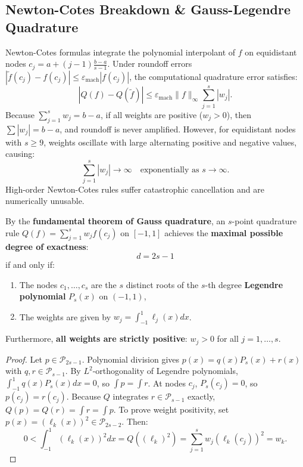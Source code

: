 \subsection{Newton-Cotes Breakdown \& Gauss-Legendre Quadrature}

Newton-Cotes formulas integrate the polynomial interpolant of $f$ on equidistant nodes $c_j = a + (j-1)\frac{b-a}{s-1}$. Under roundoff errors $|\tilde{f}(c_j) - f(c_j)| \le \varepsilon_{\text{mach}}|f(c_j)|$, the computational quadrature error satisfies:
\begin{equation}
    |Q(f) - Q(\tilde{f})| \le \varepsilon_{\text{mach}} \|f\|_\infty \sum_{j=1}^{s} |w_j|.
\end{equation}
Because $\sum_{j=1}^s w_j = b - a$, if all weights are positive ($w_j > 0$), then $\sum |w_j| = b - a$, and roundoff is never amplified. However, for equidistant nodes with $s \ge 9$, weights oscillate with large alternating positive and negative values, causing:
\begin{equation}
    \sum_{j=1}^{s} |w_j| \to \infty \quad \text{exponentially as } s \to \infty.
\end{equation}
High-order Newton-Cotes rules suffer catastrophic cancellation and are numerically unusable.

\begin{theorem}
    By the \textbf{fundamental theorem of Gauss quadrature}, an $s$-point quadrature rule $Q(f) = \sum_{j=1}^{s} w_j f(c_j)$ on $[-1, 1]$ achieves the \textbf{maximal possible degree of exactness}:
    \begin{equation}
        d = 2s - 1
    \end{equation}
    if and only if:
    \begin{enumerate}
        \item The nodes $c_1, \dots, c_s$ are the $s$ distinct roots of the $s$-th degree \textbf{Legendre polynomial} $P_s(x)$ on $(-1, 1)$,
        \item The weights are given by $w_j = \int_{-1}^{1} \ell_j(x) dx$.
    \end{enumerate}
    Furthermore, \textbf{all weights are strictly positive}: $w_j > 0$ for all $j = 1, \dots, s$.
\end{theorem}
\begin{proof}
    Let $p \in \mathcal{P}_{2s-1}$. Polynomial division gives $p(x) = q(x) P_s(x) + r(x)$ with $q, r \in \mathcal{P}_{s-1}$. By $L^2$-orthogonality of Legendre polynomials, $\int_{-1}^1 q(x) P_s(x) dx = 0$, so $\int p = \int r$. At nodes $c_j$, $P_s(c_j) = 0$, so $p(c_j) = r(c_j)$. Because $Q$ integrates $r \in \mathcal{P}_{s-1}$ exactly, $Q(p) = Q(r) = \int r = \int p$.
    To prove weight positivity, set $p(x) = (\ell_k(x))^2 \in \mathcal{P}_{2s-2}$. Then:
    \begin{equation}
        0 < \int_{-1}^{1} (\ell_k(x))^2 dx = Q((\ell_k)^2) = \sum_{j=1}^{s} w_j (\ell_k(c_j))^2 = w_k.
    \end{equation}
\end{proof}

